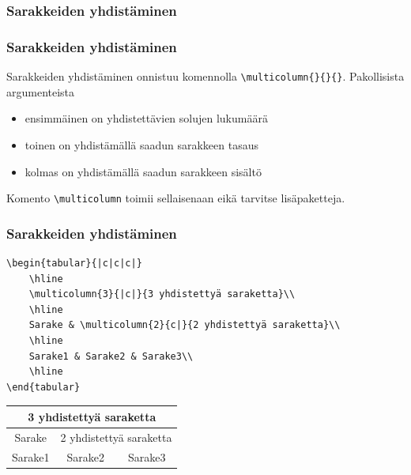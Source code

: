\documentclass[handout,hyperref={colorlinks=true}]{beamer}
\theoremstyle{remark}
\begin{document}
\subsubsection{Sarakkeiden yhdistäminen}
\begin{frame}[fragile]
    \frametitle{Sarakkeiden yhdistäminen}
    Sarakkeiden yhdistäminen onnistuu komennolla \verb-\multicolumn{}{}{}-. Pakollisista argumenteista
    \begin{itemize}
        \item ensimmäinen on yhdistettävien solujen lukumäärä
        \item toinen on yhdistämällä saadun sarakkeen tasaus
        \item kolmas on yhdistämällä saadun sarakkeen sisältö
    \end{itemize}
    Komento \verb-\multicolumn- toimii sellaisenaan eikä tarvitse lisäpaketteja.
\end{frame}
\begin{frame}[fragile]
    \frametitle{Sarakkeiden yhdistäminen}
    \begin{scriptsize}
        \begin{Verbatim}[frame=single]
\begin{tabular}{|c|c|c|}
    \hline
    \multicolumn{3}{|c|}{3 yhdistettyä saraketta}\\
    \hline
    Sarake & \multicolumn{2}{c|}{2 yhdistettyä saraketta}\\
    \hline
    Sarake1 & Sarake2 & Sarake3\\
    \hline
\end{tabular}
        \end{Verbatim}
    \end{scriptsize}
    \begin{minipage}{5cm}
        \begin{scriptsize}
            \begin{tabular}{|c|c|c|}
                \hline
                \multicolumn{3}{|c|}{3 yhdistettyä saraketta}\\
                \hline
                Sarake & \multicolumn{2}{c|}{2 yhdistettyä saraketta}\\
                \hline
                Sarake1 & Sarake2 & Sarake3\\
                \hline
            \end{tabular}
        \end{scriptsize}
    \end{minipage}
\end{frame}
\end{document}
